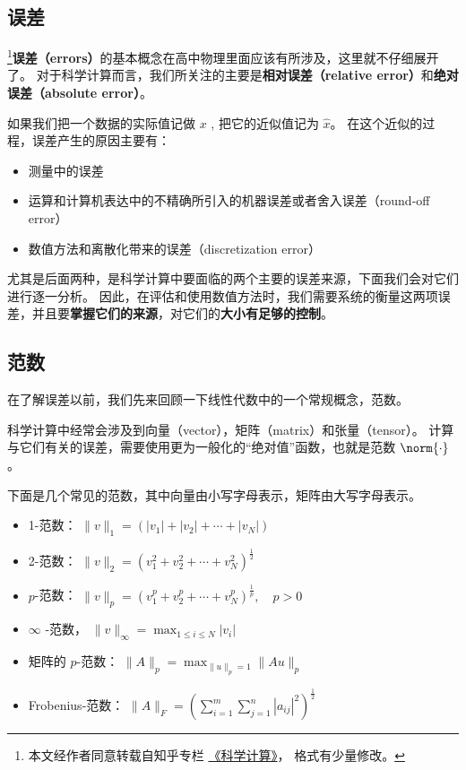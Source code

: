 

\subsection{误差}
\footnote{本文经作者同意转载自知乎专栏 \href{https://www.zhihu.com/column/c_1226443594048942080}{《科学计算》}， 格式有少量修改。}\textbf{误差（errors）}的基本概念在高中物理里面应该有所涉及，这里就不仔细展开了。 对于科学计算而言，我们所关注的主要是\textbf{相对误差（relative error）}和\textbf{绝对误差（absolute error）}。

如果我们把一个数据的实际值记做 $x$ , 把它的近似值记为 $\hat x$。 在这个近似的过程，误差产生的原因主要有：
\begin{itemize}
\item 测量中的误差
\item 运算和计算机表达中的不精确所引入的机器误差或者舍入误差（round-off error）
\item 数值方法和离散化带来的误差（discretization error）
\end{itemize}
尤其是后面两种，是科学计算中要面临的两个主要的误差来源，下面我们会对它们进行逐一分析。 因此，在评估和使用数值方法时，我们需要系统的衡量这两项误差，并且要\textbf{掌握它们的来源}，对它们的\textbf{大小有足够的控制}。

\subsection{范数}
在了解误差以前，我们先来回顾一下线性代数中的一个常规概念，范数。

科学计算中经常会涉及到向量（vector），矩阵（matrix）和张量（tensor）。 计算与它们有关的误差，需要使用更为一般化的“绝对值”函数，也就是范数 $\norm{\cdot}$。

下面是几个常见的范数，其中向量由小写字母表示，矩阵由大写字母表示。
\begin{itemize}
\item 1-范数：  $\|v\|_1=(|v_1|+|v_2|+\cdots+|v_N|)$
\item 2-范数：  $\|v\|_2=(v_1^2+v_2^2+\cdots+v_N^2)^{\frac{1}{2}}$
\item $p$-范数：  $\|v\|_p=(v_1^p+v_2^p+\cdots+v_N^p)^{\frac{1}{p}},\quad p>0$
\item $\infty$  -范数，  $\|v\|_{\infty}=\max_{1\le i \le N}|v_i|$
\item 矩阵的 $p$-范数：  $\|A\|_p=\max_{\|u\|_p=1}\|Au\|_p$
\item Frobenius-范数：  $\|A\|_F=(\sum_{i=1}^m\sum_{j=1}^n|a_{ij}|^2)^{\frac{1}{2}}$
\end{itemize}

